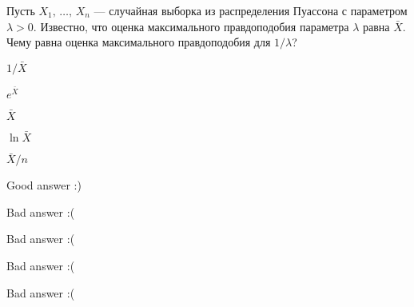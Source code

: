 
\begin{question}
Пусть \(X_1, \, \ldots, \, X_n\) --- случайная выборка из распределения
Пуассона с параметром \(\lambda > 0\). Известно, что оценка
максимального правдоподобия параметра \(\lambda\) равна \(\bar{X}\).
Чему равна оценка максимального правдоподобия для \(1 / \lambda\)?
\begin{answerlist}
  \item \(1 / \bar{X}\)
  \item \(e^{\bar{X}}\)
  \item \(\bar{X}\)
  \item \(\ln \bar{X}\)
  \item \(\bar{X} / n\)
\end{answerlist}
\end{question}

\begin{solution}
\begin{answerlist}
  \item Good answer :)
  \item Bad answer :(
  \item Bad answer :(
  \item Bad answer :(
  \item Bad answer :(
\end{answerlist}
\end{solution}

